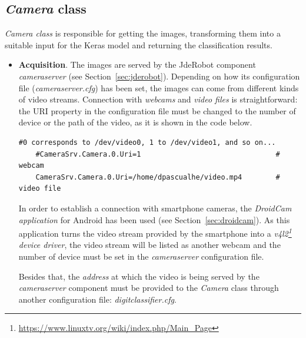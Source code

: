 \subsection{\textit{Camera} class}
\emph{\textit{Camera} class} is responsible for getting the images, transforming them into a suitable input for the Keras model and returning the classification results.

\begin{itemize}
	\item \textbf{Acquisition}. The images are served by the JdeRobot component \emph{\textit{cameraserver}} (see Section~\ref{sec:jderobot}). Depending on how its configuration file (\textit{cameraserver.cfg}) has been set, the images can come from different kinds of video streams. Connection with \emph{webcams} and \emph{video files} is straightforward: the URI property in the configuration file must be changed to the number of device or the path of the video, as it is shown in the code below.
	\begin{lstlisting}[frame=single]
	#0 corresponds to /dev/video0, 1 to /dev/video1, and so on...
	#CameraSrv.Camera.0.Uri=1                                # webcam
	CameraSrv.Camera.0.Uri=/home/dpascualhe/video.mp4        # video file
	\end{lstlisting}
	
	In order to establish a connection with smartphone cameras, the \emph{DroidCam application} for Android has been used (see Section~\ref{sec:droidcam}). As this application turns the video stream provided by the smartphone into a \emph{v4l2\footnote{\url{https://www.linuxtv.org/wiki/index.php/Main_Page}} device driver}, the video stream will be listed as another webcam and the number of device must be set in the \textit{cameraserver} configuration file.
	
	Besides that, the \emph{address} at which the video is being served by the \textit{cameraserver} component must be provided to the \textit{Camera} class through another configuration file: \emph{\textit{digitclassifier.cfg}}.
	

\end{itemize}
